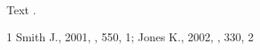 \documentclass{mn2e}
\begin{document}
Text \cite{a}.
\begin{thebibliography}{1}
 Smith J., 2001, \apj, 550, 1; Jones K., 2002, \mnras, 330, 2
\end{thebibliography}
\end{document}

